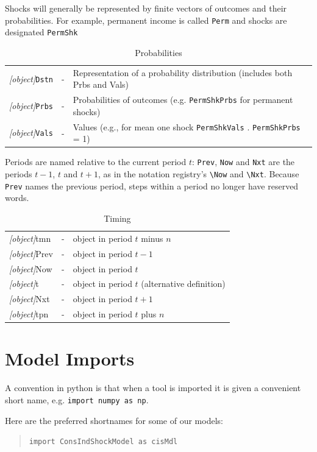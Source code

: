 \documentclass{econark}
\begin{document}
\medskip\medskip
\hypertarget{Shocks}{}
Shocks will generally be represented by finite vectors of outcomes and their probabilities.  For example, permanent income is called \texttt{Perm} and shocks are designated \texttt{PermShk}
\begin{table}[ht]
  \centering
  \begin{tabular}{|>{\ttfamily}ccl|}
    \hline
    \textit{[object]}\texttt{Dstn} & - & Representation of a probability distribution (includes both Prbs and Vals)
    \\ \textit{[object]}\texttt{Prbs} & - & Probabilities of outcomes (e.g. \texttt{PermShkPrbs} for permanent shocks)
    \\ \textit{[object]}\texttt{Vals} & - & Values (e.g., for mean one shock \texttt{PermShkVals} . \texttt{PermShkPrbs} = 1)
    \\ 	\hline
  \end{tabular}
  \caption{Probabilities}
  \label{table:Probabilities}
\end{table}

\hypertarget{Timing}{}
Periods are named relative to the current period $t$: \texttt{Prev}, \texttt{Now} and \texttt{Nxt} are the periods $t-1$, $t$ and $t+1$, as in the notation registry's \verb|\Now| and \verb|\Nxt|.  Because \texttt{Prev} names the previous period, steps within a period no longer have reserved words.
\begin{table}[ht]
  \centering
  \begin{tabular}{|>{\ttfamily}lcl|}
    \hline
    \textit{[object]}tmn & - & object in period $t$ minus $n$
    \\ \textit{[object]}Prev & - & object in period $t-1$
    \\ \textit{[object]}Now & - & object in period $t$
    \\ \textit{[object]}t & - & object in period $t$ (alternative definition)
    \\ \textit{[object]}Nxt & - & object in period $t+1$
    \\ \textit{[object]}tpn & - & object in period $t$ plus $n$
    \\	\hline
  \end{tabular}
  \caption{Timing}
  \label{table:Timing}
\end{table}

\section{Model Imports}

A convention in python is that when a tool is imported it is given a convenient short name,
e.g. \texttt{import numpy as np}.

Here are the preferred shortnames for some of our models:

\begin{quote}
  \texttt{import ConsIndShockModel as cisMdl}
\end{quote}

\clearpage

\vfill\eject\pagebreak\newpage


\end{document}
